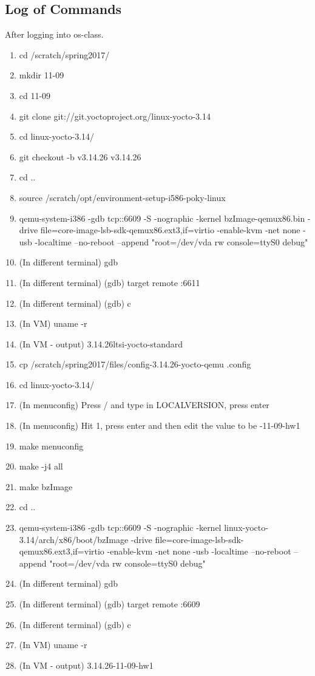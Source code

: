 \documentclass[journal, letterpaper, draftclsnofoot, onecolumn, 10pt]{IEEEtran}
\begin{document}
\subsection{Log of Commands}
After logging into os-class.
\begin{enumerate}
\item cd /scratch/spring2017/
\item mkdir 11-09
\item cd 11-09
\item git clone git://git.yoctoproject.org/linux-yocto-3.14
\item cd linux-yocto-3.14/
\item git checkout -b v3.14.26 v3.14.26
\item cd ..
\item source /scratch/opt/environment-setup-i586-poky-linux
\item qemu-system-i386 -gdb tcp::6609 -S -nographic -kernel bzImage-qemux86.bin -drive file=core-image-lsb-sdk-qemux86.ext3,if=virtio -enable-kvm -net none -usb -localtime --no-reboot --append "root=/dev/vda rw console=ttyS0 debug"
\item (In different terminal) gdb
\item (In different terminal) (gdb) target remote :6611
\item (In different terminal) (gdb) c
\item (In VM) uname -r
\item (In VM - output) 3.14.26ltsi-yocto-standard
\item cp /scratch/spring2017/files/config-3.14.26-yocto-qemu .config
\item cd linux-yocto-3.14/
\item (In menuconfig) Press / and type in LOCALVERSION, press enter
\item (In menuconfig) Hit 1, press enter and then edit the value to be -11-09-hw1
\item make menuconfig
\item make -j4 all
\item make bzImage
\item cd ..
\item qemu-system-i386 -gdb tcp::6609 -S -nographic -kernel linux-yocto-3.14/arch/x86/boot/bzImage -drive file=core-image-lsb-sdk-qemux86.ext3,if=virtio -enable-kvm -net none -usb -localtime --no-reboot --append "root=/dev/vda rw console=ttyS0 debug"
\item (In different terminal) gdb
\item (In different terminal) (gdb) target remote :6609
\item (In different terminal) (gdb) c
\item (In VM) uname -r
\item (In VM - output) 3.14.26-11-09-hw1
\end{enumerate}
\end{document}
